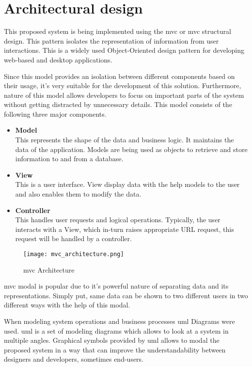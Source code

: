 \documentclass[12pt]{report}
\begin{document}
\section{Architectural design}
This proposed system is being implemented using the \acrshort{mvc} or \acrlong{mvc} structural design. This pattern isolates the representation of information from user interactions. This is a widely used Object-Oriented design pattern for developing web-based and desktop applications.

Since this model provides an isolation between different components based on their  usage, it’s very suitable for the development of this solution. Furthermore, nature of this model allows developers to focus on important parts of the system without getting distracted by unnecessary details. This model consists of the following three major components.

\begin{itemize}
	\item {\bf{Model}}\\
	      This represents the shape of the data and business logic. It maintains the data of the application. Models are being used as objects to retrieve and store information to and from a database.

	\item {\bf{View}}\\
	      This is a user interface. View display data with the help models to the user and also enables them to modify the data.

	\item {\bf{Controller}}\\
	      This handles user requests and logical operations. Typically, the user interacts with a View, which in-turn raises appropriate URL request, this request will be handled by a controller.
\end{itemize}

\begin{figure}[H]
	\centering
	\texttt{[image: mvc\_architecture.png]}
	\caption{\acrshort{mvc} Architecture}
\end{figure}

\acrshort{mvc} modal is popular due to it’s powerful nature of separating data and its representations. Simply put, same data can be shown to two different users in two different ways with the help of this modal.

When modeling system operations and business processes \acrshort{uml} Diagrams were used. \acrshort{uml} is a set of modeling diagrams which allows to look at a system in multiple angles. Graphical symbols provided by \acrshort{uml} allows to modal the proposed system in a way that can improve the understandability between designers and developers, sometimes end-users.
\end{document}
